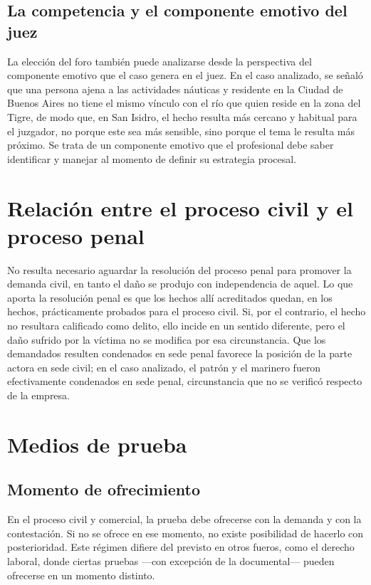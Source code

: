 \documentclass[12pt,oneside]{book}
\begin{document}
\section{La competencia y el componente emotivo del juez}

La elección del foro también puede analizarse desde la perspectiva del componente emotivo que el caso genera en el juez. En el caso analizado, se señaló que una persona ajena a las actividades náuticas y residente en la Ciudad de Buenos Aires no tiene el mismo vínculo con el río que quien reside en la zona del Tigre, de modo que, en San Isidro, el hecho resulta más cercano y habitual para el juzgador, no porque este sea más sensible, sino porque el tema le resulta más próximo. Se trata de un componente emotivo que el profesional debe saber identificar y manejar al momento de definir su estrategia procesal.

\chapter{Relación entre el proceso civil y el proceso penal}

No resulta necesario aguardar la resolución del proceso penal para promover la demanda civil, en tanto el daño se produjo con independencia de aquel. Lo que aporta la resolución penal es que los hechos allí acreditados quedan, en los hechos, prácticamente probados para el proceso civil. Si, por el contrario, el hecho no resultara calificado como delito, ello incide en un sentido diferente, pero el daño sufrido por la víctima no se modifica por esa circunstancia. Que los demandados resulten condenados en sede penal favorece la posición de la parte actora en sede civil; en el caso analizado, el patrón y el marinero fueron efectivamente condenados en sede penal, circunstancia que no se verificó respecto de la empresa.

\chapter{Medios de prueba}

\section{Momento de ofrecimiento}

\begin{important}
En el proceso civil y comercial, la prueba debe ofrecerse con la demanda y con la contestación. Si no se ofrece en ese momento, no existe posibilidad de hacerlo con posterioridad. Este régimen difiere del previsto en otros fueros, como el derecho laboral, donde ciertas pruebas —con excepción de la documental— pueden ofrecerse en un momento distinto.
\end{important}
\end{document}
